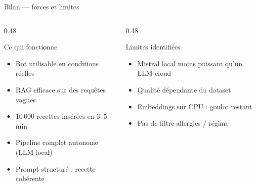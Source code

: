 \documentclass[aspectratio=169]{beamer}
\begin{document}
\begin{frame}{Bilan --- forces et limites}
\begin{columns}[T]
\begin{column}{0.48\textwidth}
  \begin{exampleblock}{Ce qui fonctionne}
  \footnotesize
  \begin{itemize}
    \item Bot utilisable en conditions r\'eelles
    \item RAG efficace sur des requ\^etes vagues
    \item 10\,000 recettes ins\'er\'ees en 3--5 min
    \item Pipeline complet autonome (LLM local)
    \item Prompt structur\'e : recette coh\'erente
  \end{itemize}
  \end{exampleblock}
\end{column}
\begin{column}{0.48\textwidth}
  \begin{alertblock}{Limites identifi\'ees}
  \footnotesize
  \begin{itemize}
    \item Mistral local moins puissant qu'un LLM cloud
    \item Qualit\'e d\'ependante du dataset
    \item Embeddings sur CPU : goulot restant
    \item Pas de filtre allergies / r\'egime
  \end{itemize}
  \end{alertblock}
\end{column}
\end{columns}
\end{frame}
\end{document}
